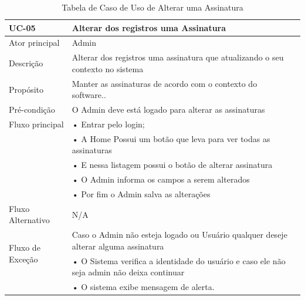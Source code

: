 \documentclass[a4paper,12pt]{article}
\begin{document}
\begin{table}[ht]
    \centering
    \begin{tabular}{|p{3.5cm}|p{10cm}|p{7cm}|}
        \hline
        \textbf{UC-05}                     & \textbf{ Alterar dos registros uma Assinatura}                                             \\
        \hline

        \multirow{1}{*}{Ator principal}    & Admin                                                                                      \\
        \hline
        \multirow{1}{*}{Descrição}         & Alterar dos registros uma assinatura que atualizando o seu contexto no sistema             \\
        \hline

        \multirow{1}{*}{Propósito}         & Manter as assinaturas de acordo com o contexto do software..                               \\
        \hline

        \multirow{1}{*}{Pré-condição}      & O Admin deve está logado para alterar as assinaturas                                       \\
        \hline

        \multirow{1}{*}{Fluxo principal}
                                           & • Entrar pelo login;                                                                       \\
                                           & • A Home Possui um botão que leva para ver todas as assinaturas                            \\
                                           & • E nessa listagem possui o botão de alterar assinatura                                    \\
                                           & • O Admin informa os campos a serem alterados                                              \\
                                           & • Por fim o Admin salva as alterações                                                      \\
        \cline{2-2}
        \hline

        \multirow{1}{*}{Fluxo Alternativo} & N/A                                                                                        \\
        \hline

        \multirow{2}{*}{Fluxo de Exceção}
                                           & Caso o Admin não esteja logado ou Usuário qualquer deseje alterar alguma  assinatura       \\
                                           & • O Sistema verifica a identidade do usuário e caso ele não seja admin não deixa continuar \\
                                           & • O sistema exibe mensagem de alerta.                                                      \\
        \hline
    \end{tabular}
    \caption{Tabela de Caso de Uso de Alterar uma Assinatura}
\end{table}
\end{document}
